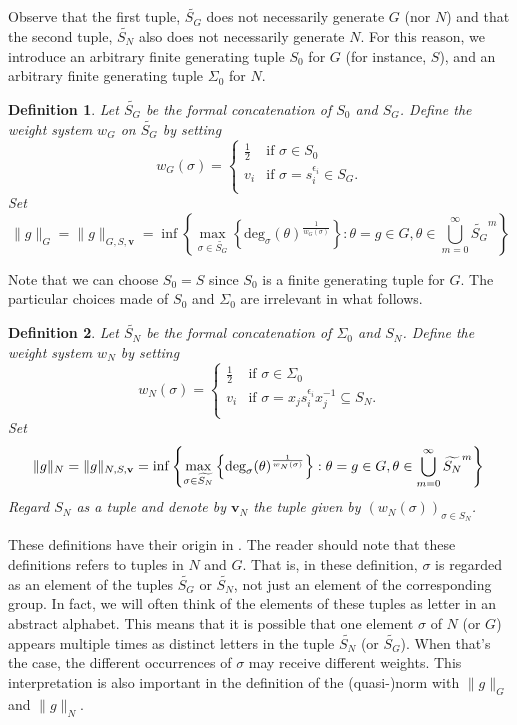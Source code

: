 \documentclass[pdflatex,sn-mathphys-num]{sn-jnl}%
\theoremstyle{thmstyleone}%
\theoremstyle{thmstyletwo}%
\theoremstyle{thmstylethree}%
\newtheorem{defin}{Definition}%
\begin{document}
Observe that the first tuple, $\widetilde{S_G}$ does not necessarily generate $G$ (nor $N$) and that the second tuple, $\widetilde{S_N}$ also does not necessarily generate $N$. For this reason, we introduce an arbitrary finite generating tuple $S_0$ for $G$ (for instance, $S$), and an arbitrary
finite generating tuple $\Sigma_0$ for $N$. 

 
\begin{defin}
\label{def: norm_G}
Let $\widetilde{S_G}$ be the formal concatenation of $S_0$ and $S_G$.
Define the weight system $w_G$ on $\widetilde{S_G}$ by setting 
$$
w_G(\sigma) = \begin{cases}
\frac{1}{2} &\text{if }\sigma \in S_0\\
v_i &\text{if }\sigma = s_i^{\epsilon_i} \in S_G.\\
\end{cases}
$$
Set 
$$ \|g\|_G =   \|g\|_{G,S,\mathbf{v}} = \inf \left\{ \max_{\sigma \in \widetilde{S_G} }\left\{ \mbox{deg}_\sigma(\theta)^\frac{1}{w_G(\sigma) } \right\}:  \theta = g \in G, \theta \in \bigcup_{m=0}^\infty \widetilde{S_G}^m\right\} $$
\end{defin}
Note that we can choose $S_0=S$ since $S_0$ is a finite generating tuple for $G$. The particular choices made  of $S_0$ and $\Sigma_0$ are irrelevant in what follows.

\begin{defin}
\label{def: norm_N}
    Let $\widetilde{S_N}$ be the formal concatenation of $\Sigma_0$ and $S_N$. 
Define the weight system $w_N$  by setting 
$$w_N(\sigma) = 
 \begin{cases}
\frac{1}{2} &\text{if }\sigma \in \Sigma_0\\
v_i &\text{if }\sigma =x_j s_i^{\epsilon_i}  x_j^{-1}  \subseteq S_N.\\
\end{cases}
$$  Set 
$$    \|g\|_N =  \|g\|_{N,S,\mathbf{v}} = \inf \left\{ \max_{\sigma \in \widetilde{S_N}}\left\{ \mbox{deg}_\sigma(\theta)^\frac{1}{w_N(\sigma) } \right\}:  \theta = g \in G, \theta \in \bigcup_{m=0}^\infty \widetilde{S_N}^m\right\}\\ $$
Regard $S_N$ as a tuple and denote by $\mathbf{v}_N$ the tuple given by $(w_N(\sigma))_{\sigma \in S_N}$. 
\end{defin}



These definitions have their origin in \cite{SCZ-nil,CKSCWZ1}. The reader should note that these definitions refers to tuples in $N$ and $G$. That is, in these definition, $\sigma$ is regarded as an element of the tuples $\widetilde{S_G}$ or $\widetilde{S_N}$, not just an element of the corresponding group. In fact, we will often think of the elements of these tuples as letter in an abstract alphabet. This means that it is possible that one element $\sigma$ of $N$ (or $G$)
appears multiple times as distinct letters in the tuple $\widetilde{S_N}$ (or $\widetilde{S_G}$). When that's the case, the different occurrences of $\sigma$ may receive different weights.
This interpretation is also important in the definition of the (quasi-)norm with $\|g\|_G$ and $\|g\|_N$.
\end{document}

